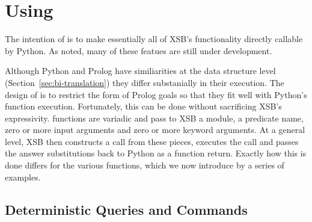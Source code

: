 %
%

\section{Using \px}

The intention of \px{} is to make essentially all of XSB's
functionality directly callable by Python.  As noted, many of these
featues are still under development.

Although Python and Prolog have similiarities at the data structure
level (Section~\ref{sec:bi-translation}) they differ substanially in
their execution.  The design of \px{} is to restrict the form of
Prolog goals so that they fit well with Python's function execution.
Fortunately, this can be done without sacrificing XSB's expressivity.
\px{} functions are variadic and pass to XSB a module, a predicate
name, zero or more input arguments and zero or more keyword arguments.
At a general level, XSB then constructs a call from these pieces,
executes the call and passes the answer substitutions back to Python
as a function return. Exactly how this is done differs for the various
\px{} functions, which we now introduce by a series of examples.  

\subsection{Deterministic Queries and Commands} \label{sec:pxdet}

